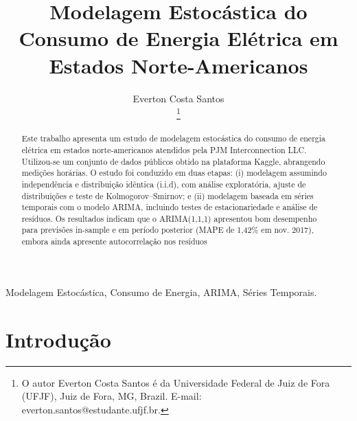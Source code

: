 \documentclass[journal]{IEEEtran}
\begin{document}
\title{Modelagem Estocástica do Consumo de Energia Elétrica em Estados Norte-Americanos}

\author{Everton Costa Santos

\thanks{O autor Everton Costa Santos é da Universidade Federal de Juiz de Fora (UFJF), Juiz de Fora, MG, Brazil. E-mail: everton.santos@estudante.ufjf.br.}

}



%
{}


\maketitle

\begin{abstract}

Este trabalho apresenta um estudo de modelagem estocástica do consumo de energia elétrica em estados norte-americanos atendidos pela PJM Interconnection LLC. Utilizou-se um conjunto de dados públicos obtido na plataforma Kaggle, abrangendo medições horárias. O estudo foi conduzido em duas etapas: (i) modelagem assumindo independência e distribuição idêntica (i.i.d), com análise exploratória, ajuste de distribuições e teste de Kolmogorov–Smirnov; e (ii) modelagem baseada em séries temporais com o modelo ARIMA, incluindo testes de estacionariedade e análise de resíduos. Os resultados indicam que o ARIMA(1,1,1) apresentou bom desempenho para previsões in-sample e em período posterior (MAPE de 1,42\% em nov. 2017), embora ainda apresente autocorrelação nos resíduos


\end{abstract}


\begin{IEEEkeywords}
Modelagem Estocástica, Consumo de Energia, ARIMA, Séries Temporais.
\end{IEEEkeywords}


\section{Introdução}
\label{sec_Intro}
\end{document}
